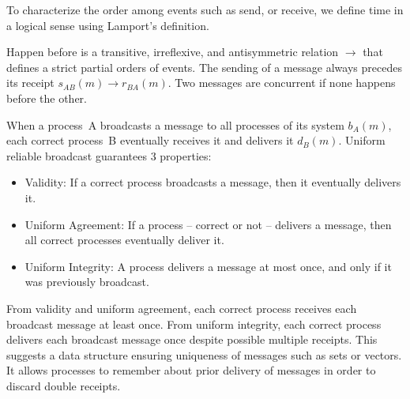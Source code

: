 To characterize the order among events such as send, or receive, we define time
in a logical sense using Lamport’s definition.

\begin{definition}
  Happen before is a transitive, irreflexive, and antisymmetric relation
  $\rightarrow$ that defines a strict partial orders of events. The sending of a
  message always precedes its receipt $s_{AB}(m) \rightarrow r_{BA}(m)$. Two
  messages are concurrent if none happens before the other.
\end{definition}

\begin{definition} 
  When a process~A broadcasts a message to all processes of its system $b_A(m)$,
  each correct process~B eventually receives it and delivers it
  $d_B(m)$. Uniform reliable broadcast guarantees 3 properties:
  \begin{itemize}[leftmargin=*]
  \item Validity: If a correct process broadcasts a message, then it
    eventually delivers it.
  \item Uniform Agreement: If a process -- correct or not -- delivers a message,
    then all correct processes eventually deliver it.
  \item Uniform Integrity: A process delivers a message at most once, and only if
    it was previously broadcast.
  \end{itemize}
\end{definition}

From validity and uniform agreement, each correct process receives each
broadcast message at least once. From uniform integrity, each correct process
delivers each broadcast message once despite possible multiple receipts.
This suggests a data structure ensuring uniqueness of messages such as sets or
vectors. It allows processes to remember about prior delivery of messages in
order to discard double receipts.

